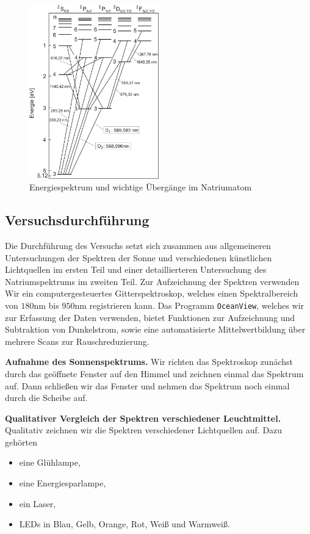 \begin{figure}[H]
  \centering
  \includegraphics[width=0.5\textwidth]{files/uebergaenge.png}
  \caption{Energiespektrum und wichtige Übergänge im Natriumatom}
  \label{fig:uebergaenge}
\end{figure}

\newpage

\subsection{Versuchsdurchführung}

Die Durchführung des Versuchs setzt sich zusammen aus allgemeineren Untersuchungen der Spektren der Sonne und verschiedenen künstlichen Lichtquellen im ersten Teil und einer detaillierteren Untersuchung des Natriumspektrums im zweiten Teil. Zur Aufzeichnung der Spektren verwenden Wir ein computergesteuertes Gitterspektroskop, welches einen Spektralbereich von $180\si{\nano\meter}$ bis $950\si{\nano\meter}$ registrieren kann. Das Programm \texttt{OceanView}, welches wir zur Erfassung der Daten verwenden, bietet Funktionen zur Aufzeichnung und Subtraktion von Dunkelstrom, sowie eine automatisierte Mittelwertbildung über mehrere Scans zur Rauschreduzierung.

\textbf{Aufnahme des Sonnenspektrums.} Wir richten das Spektroskop zunächst durch das geöffnete Fenster auf den Himmel und zeichnen einmal das Spektrum auf. Dann schließen wir das Fenster und nehmen das Spektrum noch einmal durch die Scheibe auf.

\textbf{Qualitativer Vergleich der Spektren verschiedener Leuchtmittel.} Qualitativ zeichnen wir die Spektren verschiedener Lichtquellen auf. Dazu gehörten
\begin{itemize}
  \item eine Glühlampe,
  \item eine Energiesparlampe,
  \item ein Laser,
  \item LEDs in Blau, Gelb, Orange, Rot, Weiß und Warmweiß.
\end{itemize}

